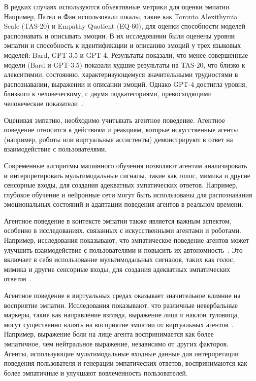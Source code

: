 В редких случаях используются объективные метрики для оценки эмпатии. Например, Пател и Фан использовали шкалы, такие как Toronto Alexithymia Scale (TAS-20) и Empathy Quotient (EQ-60), для оценки способности моделей распознавать и описывать эмоции.  В их исследовании были оценены уровни эмпатии и способность к идентификации и описанию эмоций у трех языковых моделей: Bard, GPT-3.5 и GPT-4. Результаты показали, что менее совершенные модели (Bard и GPT-3.5) показали худшие результаты на TAS-20, что близко к алекситимии, состоянию, характеризующемуся значительными трудностями в распознавании, выражении и описании эмоций. Однако GPT-4 достигла уровня, близкого к человеческому, с двумя подкатегориями, превосходящими человеческие показатели~\cite{Patel2023}.

Оценивая эмпатию, необходимо учитывать агентное поведение. Агентное поведение относится к действиям и реакциям, которые искусственные агенты (например, роботы или виртуальные ассистенты) демонстрируют в ответ на взаимодействие с пользователями.

Современные алгоритмы машинного обучения позволяют агентам анализировать и интерпретировать мультимодальные сигналы, такие как голос, мимика и другие сенсорные входы, для создания адекватных эмпатических ответов. Например, глубокое обучение и нейронные сети могут быть использованы для распознавания эмоциональных состояний и адаптации поведения агентов в реальном времени.

Агентное поведение в контексте эмпатии также является важным аспектом, особенно в исследованиях, связанных с искусственными агентами и роботами. Например, исследования показывают, что эмпатическое поведение агентов может улучшить взаимодействие с пользователями и повысить их автономность~\cite{10.11453570945.3607291}. Это включает в себя использование мультимодальных сигналов, таких как голос, мимика и другие сенсорные входы, для создания адекватных эмпатических ответов~\cite{10.1145/2912150}.

Агентное поведение в виртуальных средах оказывает значительное влияние на восприятие эмпатии. Исследования показывают, что различные невербальные маркеры, такие как направление взгляда, выражение лица и наклон туловища, могут существенно влиять на восприятие эмпатии от виртуальных агентов~\cite{doi:10.1080/10447318.2021.1987680}. Например, выражение боли на лице агента воспринимается как более эмпатичное, чем нейтральное выражение, независимо от других факторов.  Агенты, использующие мультимодальные входные данные для интерпретации поведения пользователя и генерации эмпатических ответов, воспринимаются как более эмпатичные и улучшают вовлеченность пользователей.


